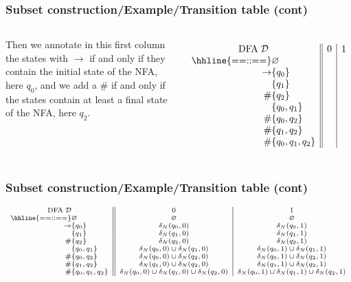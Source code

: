 % 
\begin{frame}
\frametitle{Subset construction/Example/Transition table (cont)}

\begin{columns}

   Then we annotate in this first column the
  states with \(\rightarrow\) if and only if they contain the initial
  state of the NFA, here \(q_0\), and we add a \(\#\) if and only if
  the states contain at least a final state of the NFA, here \(q_2\).

  \[
  \begin{array}{r@{}l||c|c}
    \multicolumn{2}{c||}{\text{DFA} \; {\cal D}} & 0 & 1\\
    \hhline{==::==}
    & \varnothing & &\\
    \rightarrow & \{q_0\}  & &\\
       & \{q_1\}           & &\\
    \# & \{q_2\}           & &\\
       & \{q_0, q_1\}      & &\\
    \# & \{q_0, q_2\}      & &\\
    \# & \{q_1, q_2\}      & &\\
    \# & \{q_0, q_1, q_2\} & &
  \end{array}
  \]
\end{columns}

\end{frame}

% 
\begin{frame}
\frametitle{Subset construction/Example/Transition table (cont)}
\[
\scriptsize
\begin{array}{r@{}l||c|c}
\multicolumn{2}{c||}{\text{DFA} \; {\cal D}} & 0 & 1\\
\hhline{==::==}
            & \varnothing & \varnothing & \varnothing\\
\rightarrow & \{q_0\} & \delta_N(q_0, 0) & \delta_N(q_0, 1)\\
            & \{q_1\} & \delta_N(q_1, 0) & \delta_N(q_1, 1)\\
         \# & \{q_2\} & \delta_N(q_2, 0) & \delta_N(q_2, 1)\\
            & \{q_0, q_1\} & \delta_N(q_0,0) \cup \delta_N(q_1,0) 
                           & \delta_N(q_0,1) \cup \delta_N(q_1,1)\\
         \# & \{q_0, q_2\} & \delta_N(q_0,0) \cup \delta_N(q_2,0) 
                           & \delta_N(q_0,1) \cup \delta_N(q_2,1)\\
         \# & \{q_1, q_2\} & \delta_N(q_1,0) \cup \delta_N(q_2,0) 
                           & \delta_N(q_1,1) \cup \delta_N(q_2,1)\\
         \# & \{q_0, q_1, q_2\} 
            & \delta_N(q_0,0) \cup \delta_N(q_1,0) \cup \delta_N(q_2,0)
            & \delta_N(q_0,1) \cup \delta_N(q_1,1) \cup \delta_N(q_2,1)
\end{array}
\]

\end{frame}

